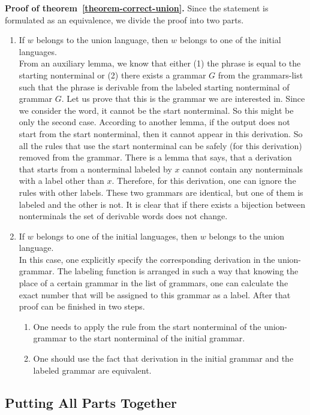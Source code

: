 \textbf{Proof of theorem~\ref{theorem-correct-union}.} Since the statement is formulated as an equivalence, we divide the proof into two parts.
\begin{enumerate}
\item If $w$ belongs to the union language, then $w$ belongs to one of the initial languages. \\
From an auxiliary lemma, we know that either (1) the phrase is equal to the starting nonterminal or (2) there exists a grammar $G$ from the grammars-list such that the phrase is derivable from the labeled starting nonterminal of grammar $G$.
Let us prove that this is the grammar we are interested in.
Since we consider the word, it cannot be the start nonterminal. So this might be only the second case.
According to another lemma, if the output does not start from the start nonterminal, then it cannot appear in this derivation. So all the rules that use the start nonterminal can be safely (for this derivation) removed from the grammar.
There is a lemma that says, that a derivation that starts from a nonterminal labeled by $x$ cannot contain any nonterminals with a label other than $x$. Therefore, for this derivation, one can ignore the rules with other labels.
These two grammars are identical, but one of them is labeled and the other is not. It is clear that if there exists a bijection between nonterminals the set of derivable words does not change.

\item If $w$ belongs to one of the initial languages, then $w$ belongs to the union language. \\
In this case, one explicitly specify the corresponding derivation in the union-grammar.
The labeling function is arranged in such a way that knowing the place of a certain grammar in the list of grammars, one can calculate the exact number that will be assigned to this grammar as a label.
After that proof can be finished in two steps. 
\begin{enumerate}
\item One needs to apply the rule from the start nonterminal of the union-grammar to the start nonterminal of the initial grammar. 
\item One should use the fact that derivation in the initial grammar and the labeled grammar are equivalent.
\end{enumerate}
\end{enumerate}

\subsection{Putting All Parts Together}

